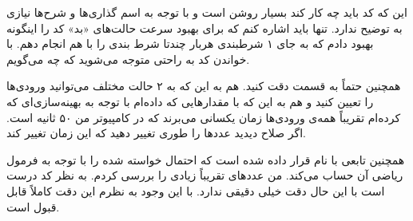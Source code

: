 \documentclass[10pt]{article}
\theoremstyle{definition}
\theoremstyle{lemma}
\theoremstyle{theorem}
\theoremstyle{remark}
\begin{document}
	این که کد باید چه کار کند بسیار روشن است و با توجه به اسم گذاری‌ها و شرح‌ها نیازی به توضیح ندارد.
	تنها باید اشاره کنم که برای بهبود سرعت حالت‌های «بد» کد را اینگونه بهبود دادم که به جای ۱ شرطبندی
	هربار چندتا شرط بندی را با هم انجام دهم. با خواندن کد به راحتی متوجه می‌شوید که چه می‌گویم.
	
	همچنین حتماً به قسمت
	دقت کنید. هم به این که به ۲ حالت مختلف می‌توانید ورودی‌ها را تعیین کنید و هم به این که با مقدار‌هایی
	که داده‌ام با توجه به بهینه‌سازی‌ای که کرده‌ام تقریباً همه‌ی ورودی‌ها زمان یکسانی می‌برند که در کامپیوتر من
	۵۰ ثانیه است. اگر صلاح دیدید عدد‌ها را طوری تغییر دهید که این زمان تغییر کند.
	
	همچنین تابعی با نام
	قرار داده شده است که احتمال خواسته شده را با توجه به فرمول ریاضی آن حساب می‌کند. من عدد‌های 
	تقریباً زیادی را بررسی کردم. به نظر کد درست است با این حال دقت خیلی دقیقی ندارد. با این وجود
	به نظرم این دقت کاملاً قابل قبول است.
	
\end{document}

